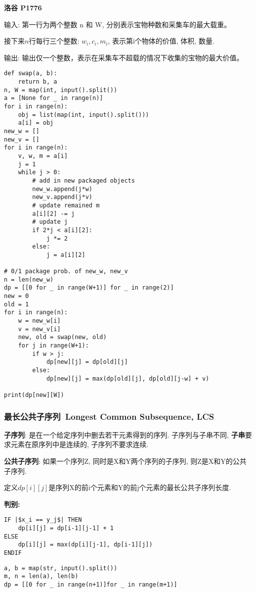 \documentclass[../main]{subfiles}
\begin{document}
\begin{sloppy}
\textbf{洛谷 P1776}

输入: 第一行为两个整数 n 和 W, 分别表示宝物种数和采集车的最大载重。

接下来$n$行每行三个整数: $w_i, c_i, m_i$, 表示第i个物体的价值, 体积, 数量.

输出: 输出仅一个整数，表示在采集车不超载的情况下收集的宝物的最大价值。

\begin{lstlisting}[style = Python]
def swap(a, b):
    return b, a
n, W = map(int, input().split())
a = [None for _ in range(n)]
for i in range(n):
    obj = list(map(int, input().split()))
    a[i] = obj
new_w = []
new_v = []
for i in range(n):
    v, w, m = a[i]
    j = 1
    while j > 0:
        # add in new packaged objects
        new_w.append(j*w)
        new_v.append(j*v)
        # update remained m
        a[i][2] -= j
        # update j
        if 2*j < a[i][2]:
            j *= 2
        else:
            j = a[i][2]
            
# 0/1 package prob. of new_w, new_v
n = len(new_w)
dp = [[0 for _ in range(W+1)] for _ in range(2)]
new = 0
old = 1
for i in range(n):
    w = new_w[i]
    v = new_v[i]
    new, old = swap(new, old)
    for j in range(W+1):
        if w > j:
            dp[new][j] = dp[old][j]
        else:
            dp[new][j] = max(dp[old][j], dp[old][j-w] + v)
            
print(dp[new][W])
\end{lstlisting}

\newpage
\subsubsection{最长公共子序列\ Longest Common Subsequence, LCS}

\textbf{子序列}: 是在一个给定序列中删去若干元素得到的序列. 子序列与子串不同, \textbf{子串}要求元素在原序列中是连续的, 子序列不要求连续. 

\textbf{公共子序列}: 如果一个序列Z, 同时是X和Y两个序列的子序列, 则Z是X和Y的公共子序列.

定义$dp[i][j]$是序列X的前i个元素和Y的前j个元素的最长公共子序列长度. 

\textbf{判别:}

\begin{lstlisting}[style = Pseudocode, escapeinside=||]
IF |$x_i == y_j$| THEN
    dp[i][j] = dp[i-1][j-1] + 1
ELSE
    dp[i][j] = max(dp[i][j-1], dp[i-1][j])
ENDIF
\end{lstlisting}

\begin{lstlisting}[style = Python]
a, b = map(str, input().split())
m, n = len(a), len(b)
dp = [[0 for _ in range(n+1)]for _ in range(m+1)]


\end{lstlisting}
\end{sloppy}
\end{document}
